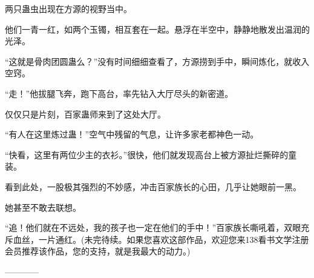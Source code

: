 \begin{this_body}
两只蛊虫出现在方源的视野当中。

他们一青一红，如两个玉镯，相互套在一起。悬浮在半空中，静静地散发出温润的光泽。

“这就是骨肉团圆蛊么？”没有时间细细查看了，方源捞到手中，瞬间炼化，就收入空窍。

“走！”他拔腿飞奔，跑下高台，率先钻入大厅尽头的新密道。

仅仅只是片刻，百家蛊师来到了这处大厅。

“有人在这里炼过蛊！”空气中残留的气息，让许多家老都神色一动。

“快看，这里有两位少主的衣衫。”很快，他们就发现高台上被方源扯烂撕碎的童装。

看到此处，一股极其强烈的不妙感，冲击百家族长的心田，几乎让她眼前一黑。

她甚至不敢去联想。

“追！他们就在不远处，我的孩子也一定在他们的手中！”百家族长嘶吼着，双眼充斥血丝，一片通红。(未完待续。如果您喜欢这部作品，欢迎您来138看书文学注册会员推荐该作品，您的支持，就是我最大的动力。)

------------

\end{this_body}

